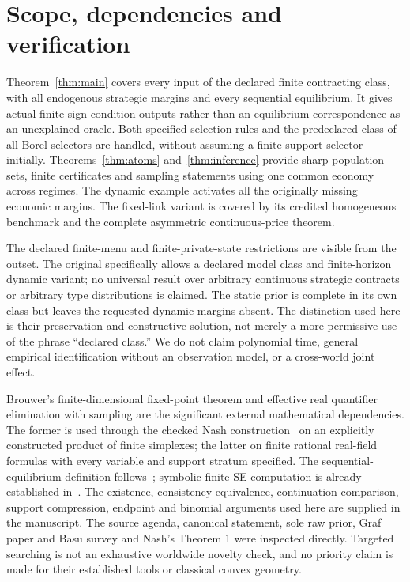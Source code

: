 \documentclass[11pt,a4paper]{article}
\numberwithin{equation}{section}
\theoremstyle{definition}
\begin{document}
\section{Scope, dependencies and verification}\label{sec:scope}

Theorem~\ref{thm:main} covers every input of the declared finite contracting
class, with all endogenous strategic margins and every sequential
equilibrium. It gives actual finite sign-condition outputs rather than
an equilibrium correspondence as an unexplained oracle. Both specified
selection rules and the predeclared class of all Borel selectors are
handled, without assuming a finite-support selector initially.
Theorems~\ref{thm:atoms} and~\ref{thm:inference} provide sharp population
sets, finite certificates and sampling statements using one common economy
across regimes. The dynamic example activates all the originally missing
economic margins. The fixed-link variant is covered by its credited
homogeneous benchmark and the complete asymmetric continuous-price theorem.

The declared finite-menu and finite-private-state restrictions are visible
from the outset. The original specifically allows a declared model class
and finite-horizon dynamic variant; no universal result over arbitrary
continuous strategic contracts or arbitrary type distributions is claimed.
The static prior is complete in its own class but leaves the requested
dynamic margins absent. The distinction used here is their preservation
and constructive solution, not merely a more permissive use of the phrase
``declared class.'' We do not claim polynomial time, general empirical
identification without an observation model, or a cross-world joint effect.

Brouwer's finite-dimensional fixed-point theorem and effective real
quantifier elimination with sampling are the significant external
mathematical dependencies. The former is used through the checked
Nash construction~\cite{Nash} on an explicitly constructed product of
finite simplexes; the latter on finite rational
real-field formulas with every variable and support stratum specified.
The sequential-equilibrium definition follows~\cite{KW}; symbolic finite
SE computation is already established in~\cite{Graf}. The existence,
consistency equivalence, continuation comparison, support compression,
endpoint and binomial arguments used here are supplied in the manuscript.
The source agenda, canonical statement, sole raw prior, Graf paper and
Basu survey and Nash's Theorem 1 were inspected directly. Targeted searching is not an
exhaustive worldwide novelty check, and no priority claim is made for
their established tools or classical convex geometry.
\end{document}
